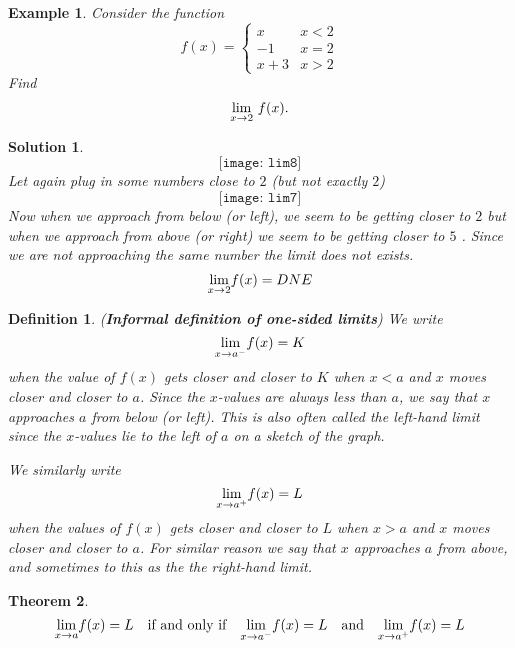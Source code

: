 \documentclass[12pt,a4paper]{book}
\newtheorem{theorem}{Theorem}[section]
\newtheorem{Example}[theorem]{Example}
\numberwithin{equation}{section}
\newtheorem*{definition}{Definition}
\newtheorem*{solution}{{\bf Solution}}
\begin{document}
\begin{Example}
	Consider the function 
	$$f(x)=
	\begin{cases}
	x & x<2\\
	-1 & x=2\\
	x+3 & x>2
	\end{cases}
	$$
	Find $$\underset{x\rightarrow 2}{\rm lim}~f(x).$$
\end{Example}

\begin{solution}
		$$
	\texttt{[image: lim8]}
	$$
	Let again plug in some numbers close to $2$ (but not exactly $2$)
		$$
	\texttt{[image: lim7]}
	$$
	Now when we approach from below (or left), we seem to be getting closer to $2$ {} but when we approach from above (or right) we seem to be getting closer to $5$ {}. Since we are not approaching the same number the limit does not exists. 
	$$\underset{x\rightarrow 2}{\rm lim}f(x)=DNE$$
	
\end{solution}

\begin{mdframed}
\begin{definition}({\bf Informal definition of one-sided limits})
	We write 
	$$
	\underset{x\rightarrow a^-}{\rm lim}f(x)=K
	$$ when the value of $f(x)$ gets closer and closer to $K$ when $x<a$ and $x$ moves closer and closer to $a$. Since the $x$-values are always less than $a$, we say that $x$ approaches $a$ from below (or left). This is also often called the left-hand limit since the $x$-values lie to the left of $a$ on a sketch of the graph.
	
	We similarly write 
	$$\underset{x\rightarrow a^{+}}{\rm lim}f(x)=L$$ when the values of $f(x)$ gets closer and closer to $L$ when $x>a$ and $x$ moves closer and closer to $a$. For similar reason we say that $x$ approaches $a$ from above, and sometimes to this as the the right-hand limit. 
\end{definition}
\end{mdframed}

\begin{mdframed}
\begin{theorem}
	$$\underset{x\rightarrow a}{\rm lim}f(x)=L\quad \text{if and only if} \quad \underset{x\rightarrow a^-}{\rm lim}f(x)=L \quad \text{and} \quad \underset{x\rightarrow a^+}{\rm lim}f(x)=L$$
\end{theorem}
\end{mdframed}
\end{document}
